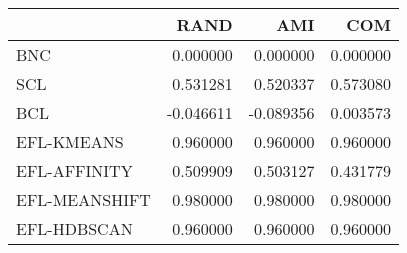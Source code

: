 \begin{tabular}{lrrr}
\toprule
 & RAND & AMI & COM \\
\midrule
BNC & 0.000000 & 0.000000 & 0.000000 \\
SCL & 0.531281 & 0.520337 & 0.573080 \\
BCL & -0.046611 & -0.089356 & 0.003573 \\
EFL-KMEANS & 0.960000 & 0.960000 & 0.960000 \\
EFL-AFFINITY & 0.509909 & 0.503127 & 0.431779 \\
EFL-MEANSHIFT & 0.980000 & 0.980000 & 0.980000 \\
EFL-HDBSCAN & 0.960000 & 0.960000 & 0.960000 \\
\bottomrule
\end{tabular}
